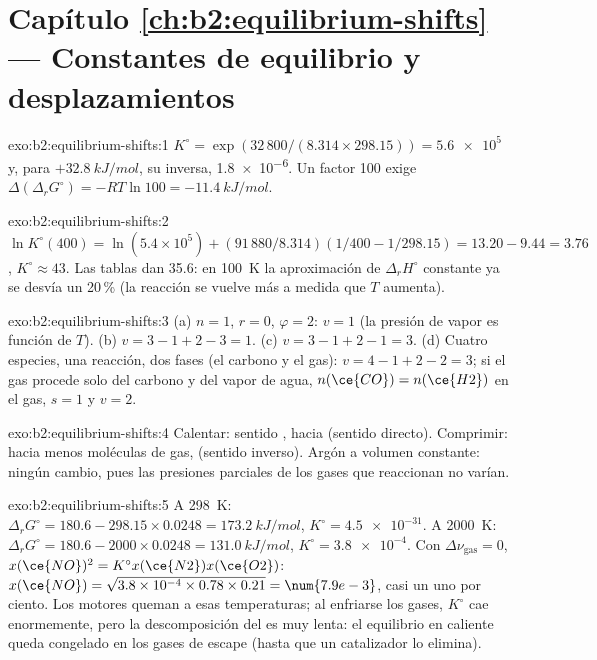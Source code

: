 \section*{Capítulo \ref{ch:b2:equilibrium-shifts} --- Constantes de equilibrio y desplazamientos}

\begin{solution}{exo:b2:equilibrium-shifts:1}
$K^\circ = \exp(32\,800/(8.314 \times 298.15)) = \num{5.6e5}$ y, para
$+\qty{32.8}{kJ/mol}$, su inversa, \num{1.8e-6}. Un factor 100 exige
$\Delta(\Delta_r G^\circ) = -RT\ln 100 = \qty{-11.4}{kJ/mol}$.
\end{solution}

\begin{solution}{exo:b2:equilibrium-shifts:2}
$\ln K^\circ(400) = \ln(5.4 \times 10^5) + (91\,880/8.314)(1/400 -
1/298.15) = 13.20 - 9.44 = 3.76$, $K^\circ \approx 43$. Las tablas dan 35.6:
en \qty{100}{K} la aproximación de $\Delta_r H^\circ$ constante ya se
desvía un 20\,\% (la reacción se vuelve más  a medida que $T$ aumenta).
\end{solution}

\begin{solution}{exo:b2:equilibrium-shifts:3}
(a) $n = 1$, $r = 0$, $\varphi = 2$: $v = 1$ (la presión de vapor es función
de $T$). (b) $v = 3 - 1 + 2 - 3 = 1$. (c) $v = 3 - 1 + 2 - 1 = 3$. (d) Cuatro
especies, una reacción, dos fases (el carbono y el gas): $v = 4 - 1 + 2 - 2 =
3$; si el gas procede solo del carbono y del vapor de agua, $n(\ce{CO}) = n(\ce{H2})$
en el gas, $s = 1$ y $v = 2$.
\end{solution}

\begin{solution}{exo:b2:equilibrium-shifts:4}
Calentar: sentido , hacia  (sentido directo). Comprimir:
hacia menos moléculas de gas,  (sentido inverso). Argón a volumen constante:
ningún cambio, pues las presiones parciales de los gases que reaccionan no varían.
\end{solution}

\begin{solution}{exo:b2:equilibrium-shifts:5}
A \qty{298}{K}: $\Delta_r G^\circ = 180.6 - 298.15 \times 0.0248 =
\qty{173.2}{kJ/mol}$, $K^\circ = \num{4.5e-31}$. A \qty{2000}{K}: $\Delta_r
G^\circ = 180.6 - 2000 \times 0.0248 = \qty{131.0}{kJ/mol}$, $K^\circ =
\num{3.8e-4}$. Con $\Delta\nu_{\text{gas}} = 0$, $x(\ce{NO})^2 = K^\circ x(\ce{N2})
x(\ce{O2})$: $x(\ce{NO}) = \sqrt{3.8 \times 10^{-4} \times 0.78 \times 0.21} =
\num{7.9e-3}$, casi un uno por ciento. Los motores queman a esas temperaturas; al
enfriarse los gases, $K^\circ$ cae enormemente, pero la descomposición del  es
muy lenta: el equilibrio en caliente queda congelado en los gases de escape (hasta que un catalizador
lo elimina).
\end{solution}

